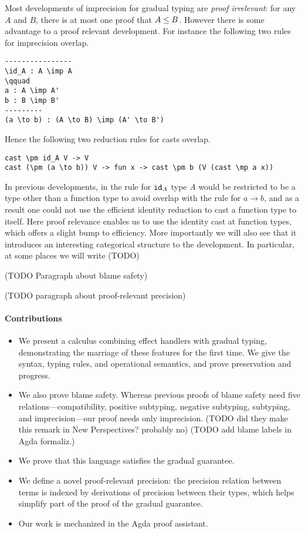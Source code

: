 Most developments of imprecision for gradual typing are \emph{proof irrelevant}:
for any $A$ and $B$, there is at most one proof that $A \le B$.
However there is some advantage to a proof relevant development.
For instance the following two rules for imprecision overlap.
\begin{verbatim}
----------------
\id_A : A \imp A
\qquad
a : A \imp A'
b : B \imp B'
---------
(a \to b) : (A \to B) \imp (A' \to B')
\end{verbatim}
Hence the following two reduction rules for casts overlap.
\begin{verbatim}
cast \pm id_A V -> V
cast (\pm (a \to b)) V -> fun x -> cast \pm b (V (cast \mp a x))
\end{verbatim}
In previous developments, in the rule for $\mathtt{id}_A$ type $A$ would be restricted
to be a type other than a function type to avoid overlap with the rule for $a \to b$,
and as a result one could not use the efficient identity reduction to cast
a function type to itself. Here proof relevance enables us to use the
identity cast at function types, which offers a slight bump to efficiency.
More importantly we will also see that it introduces an interesting
categorical structure to the development. In particular, at some places
we will write (TODO)


(TODO Paragraph about blame safety)

(TODO paragraph about proof-relevant precision)

\paragraph{Contributions}

\begin{itemize}
  \item We present a calculus combining effect handlers with gradual typing,
    demonstrating the marriage of these features for the first time.
    We give the syntax, typing rules, and operational semantics,
    and prove preservation and progress.
  \item We also prove blame safety.
    Whereas previous proofs of blame safety need five
    relations---compatibility, positive subtyping, negative subtyping,
    subtyping, and imprecision---our proof needs only imprecision.
    (TODO did they make this remark in New Perspectives? probably no)
    (TODO add blame labels in Agda formaliz.)
  \item We prove that this language satisfies the gradual guarantee.
  \item We define a novel proof-relevant precision: the precision relation
    between terms is indexed by derivations of precision between their types,
    which helps simplify part of the proof of the gradual guarantee.
  \item Our work is mechanized in the Agda proof assistant.
\end{itemize}

